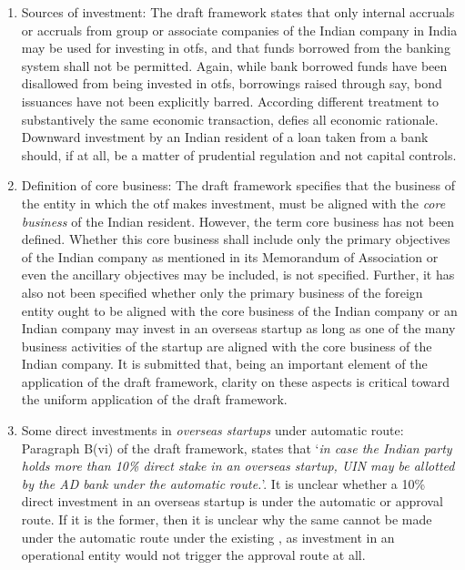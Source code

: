 \documentclass[11pt,a4paper]{article} \usepackage[parfill]{parskip}
\begin{document}
\begin{description}
\begin{enumerate}
  \item Sources of investment: The draft framework states that only
    internal accruals or accruals from group or associate companies of
    the Indian company in India may be used for investing in
    \glspl{otf}, and that funds borrowed from the banking system shall
    not be permitted. Again, while bank borrowed funds have been
    disallowed from being invested in \glspl{otf}, borrowings raised
    through say, bond issuances have not been explicitly
    barred. According different treatment to substantively the same
    economic transaction, defies all economic rationale. Downward
    investment by an Indian resident of a loan taken from a bank
    should, if at all, be a matter of prudential regulation and not
    capital controls.

  \item Definition of core business: The draft framework specifies
    that the business of the entity in which the \gls{otf} makes
    investment, must be aligned with the \emph{core business} of the
    Indian resident. However, the term core business has not been
    defined. Whether this core business shall include only the primary
    objectives of the Indian company as mentioned in its Memorandum of
    Association or even the ancillary objectives may be included, is
    not specified. Further, it has also not been specified whether
    only the primary business of the foreign entity ought to be
    aligned with the core business of the Indian company or an Indian
    company may invest in an overseas startup as long as one of the
    many business activities of the startup are aligned with the core
    business of the Indian company. It is submitted that, being an
    important element of the application of the draft framework,
    clarity on these aspects is critical toward the uniform
    application of the draft framework.

  \item Some direct investments in \textsl{overseas startups} under
    automatic route: Paragraph B(vi) of the draft framework, states
    that `\emph{in case the Indian party holds more than 10\% direct
      stake in an overseas startup, UIN may be allotted by the AD bank
      under the automatic route.}'. It is unclear whether a 10\%
    direct investment in an overseas startup is under the automatic or
    approval route. If it is the former, then it is unclear why the
    same cannot be made under the automatic route under the existing
    , as investment in an operational entity would
    not trigger the approval route at all.
  \end{enumerate}


\end{description}
\end{document}
